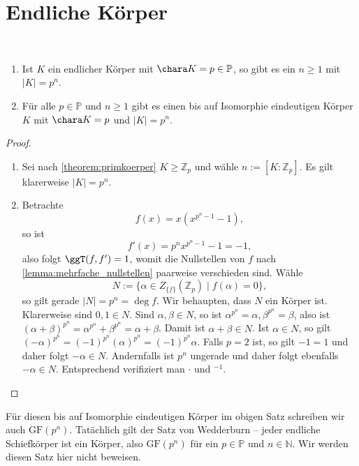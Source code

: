 \section{Endliche Körper}

\begin{theorem}{\ }\label{theorem:endliche_koerper_eindeutigkeit}
    \begin{enumerate}
        \item Ist $K$ ein endlicher Körper mit $\chara K = p \in \mathbb{P}$, so gibt es ein $n \geq 1$ mit $\vert K \vert = p^n$.
        \item Für alle $p \in \mathbb{P}$ und $n \geq 1$ gibt es einen bis auf Isomorphie eindeutigen Körper $K$ mit $\chara K = p$ und $\vert K \vert = p^n$.
    \end{enumerate}
\end{theorem}

\begin{proof}{\ }
    \begin{enumerate}
        \item Sei nach \cref{theorem:primkoerper} $K \geq \mathbb{Z}_p$ und wähle $n := [K : \mathbb{Z}_p]$. Es gilt klarerweise $\vert K \vert = p^n$.
        \item Betrachte
        $$ f(x) = x(x^{p^n - 1} - 1), $$
        so ist
        $$ f'(x) = p^n x^{p^n - 1} - 1 = -1, $$
        also folgt $\ggT(f, f') = 1$, womit die Nullstellen von $f$ nach \cref*{lemma:mehrfache_nullstellen} paarweise verschieden sind. Wähle
        $$ N := \{ \alpha \in Z_{\{f\}}(\mathbb{Z}_p) \mid f(\alpha) = 0 \}, $$
        so gilt gerade $\vert N \vert = p^n = \deg f$. Wir behaupten, dass $N$ ein Körper ist. Klarerweise sind $0, 1 \in N$. Sind $\alpha, \beta \in N$, so ist $\alpha^{p^n} = \alpha, \beta^{p^n} = \beta$, also ist $(\alpha + \beta)^{p^n} = \alpha^{p^n} + \beta^{p^n} = \alpha + \beta$. Damit ist $\alpha + \beta \in N$. 
        Ist $\alpha\in N$, so gilt $(-\alpha)^{p^n}=(-1)^{p^n}(\alpha)^{p^n}=(-1)^{p^n}\alpha$. Falls $p=2$ ist, so gilt $-1=1$ und daher folgt $-\alpha\in N$. Andernfalls ist $p^n$ ungerade und daher folgt ebenfalls $-\alpha\in N$.
        Entsprechend verifiziert man $\cdot$ und ${}^{-1}$.
    \end{enumerate}
\end{proof}

\begin{remark}
    Für diesen bis auf Isomorphie eindeutigen Körper im obigen Satz schreiben wir auch $\mathrm{GF}(p^n)$. Tatächlich gilt der Satz von Wedderburn -- jeder endliche Schiefkörper ist ein Körper, also $\mathrm{GF}(p^n)$ für ein $p\in\mathbb{P}$ und $n\in\mathbb{N}$. Wir werden diesen Satz hier nicht beweisen. 
\end{remark}

